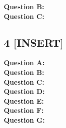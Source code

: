 \documentclass[12 pt]{article}
\begin{document}
	
	\noindent\textbf{Question B:} \\

	
	\noindent\textbf{Question C:} 
	
	\subsection*{4 [INSERT]}
	\noindent\textbf{Question A:} \\
	
	\noindent\textbf{Question B:} \\

	
	\noindent\textbf{Question C: } \\
	
	\noindent\textbf{Question D:} \\


	\noindent\textbf{Question E:} \\
	
	\noindent\textbf{Question F:} \\
	
	\noindent\textbf{Question G:} 
	
\end{document}
